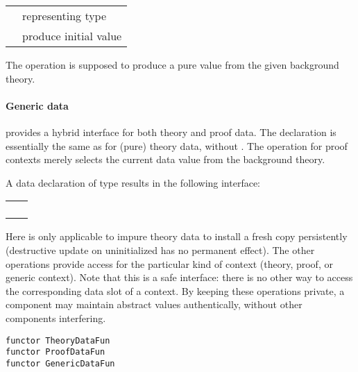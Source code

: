 \begin{isabellebody}
\begin{isamarkuptext}
  \medskip
  \begin{tabular}{ll}
  \isa{{\isasymtype}\ T} & representing type \\
  \isa{{\isasymval}\ init{\isacharcolon}\ theory\ {\isasymrightarrow}\ T} & produce initial value \\
  \end{tabular}
  \medskip

  \noindent The  operation is supposed to produce a pure
  value from the given background theory.

  \paragraph{Generic data} provides a hybrid interface for both theory
  and proof data.  The declaration is essentially the same as for
  (pure) theory data, without .  The 
  operation for proof contexts merely selects the current data value
  from the background theory.

  \bigskip A data declaration of type  results in the
  following interface:

  \medskip
  \begin{tabular}{ll}
  \isa{init{\isacharcolon}\ theory\ {\isasymrightarrow}\ theory} \\
  \isa{get{\isacharcolon}\ context\ {\isasymrightarrow}\ T} \\
  \isa{put{\isacharcolon}\ T\ {\isasymrightarrow}\ context\ {\isasymrightarrow}\ context} \\
  \isa{map{\isacharcolon}\ {\isacharparenleft}T\ {\isasymrightarrow}\ T{\isacharparenright}\ {\isasymrightarrow}\ context\ {\isasymrightarrow}\ context} \\
  \end{tabular}
  \medskip

  \noindent Here  is only applicable to impure theory
  data to install a fresh copy persistently (destructive update on
  uninitialized has no permanent effect).  The other operations provide
  access for the particular kind of context (theory, proof, or generic
  context).  Note that this is a safe interface: there is no other way
  to access the corresponding data slot of a context.  By keeping
  these operations private, a component may maintain abstract values
  authentically, without other components interfering.%
\end{isamarkuptext}%
\isamarkuptrue%
%
\isadelimmlref
%
\endisadelimmlref
%
\isatagmlref
%
\begin{isamarkuptext}%
\begin{mldecls}
  \verb|functor TheoryDataFun| \\
  \verb|functor ProofDataFun| \\
  \verb|functor GenericDataFun| \\
  \end{mldecls}


\end{isamarkuptext}
\end{isabellebody}

